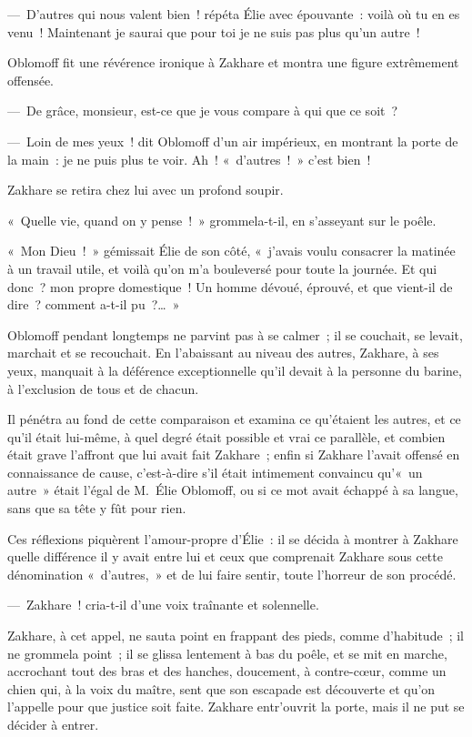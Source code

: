 \documentclass[french,twoside]{book} %
\begin{document}
— D’autres qui nous valent bien ! répéta Élie avec épouvante : voilà où tu en es venu ! Maintenant je saurai que pour toi je ne suis pas plus qu’un autre !\par
Oblomoff fit une révérence ironique à Zakhare et montra une figure extrêmement offensée.\par
— De grâce, monsieur, est-ce que je vous compare à qui que ce soit ?\par
— Loin de mes yeux ! dit Oblomoff d’un air impérieux, en montrant la porte de la main : je ne puis plus te voir. Ah ! « d’autres ! » c’est bien !\par
Zakhare se retira chez lui avec un profond soupir.\par
« Quelle vie, quand on y pense ! » grommela-t-il, en s’asseyant sur le poêle.\par
« Mon Dieu ! » gémissait Élie de son côté, « j’avais voulu consacrer la matinée à un travail utile, et voilà qu’on m’a bouleversé pour toute la journée. Et qui donc ? mon propre domestique ! Un homme dévoué, éprouvé, et que vient-il de dire ? comment a-t-il pu ?… »\par
Oblomoff pendant longtemps ne parvint pas à se calmer ; il se couchait, se levait, marchait et se recouchait. En l’abaissant au niveau des autres, Zakhare, à ses yeux, manquait à la déférence exceptionnelle qu’il devait à la personne du barine, à l’exclusion de tous et de chacun.\par
Il pénétra au fond de cette comparaison et examina ce qu’étaient les autres, et ce qu’il était lui-même, à quel degré était possible et vrai ce parallèle, et combien était grave l’affront que lui avait fait Zakhare ; enfin si Zakhare l’avait offensé en connaissance de cause, c’est-à-dire s’il était intimement convaincu qu’« un autre » était l’égal de M. Élie Oblomoff, ou si ce mot avait échappé à sa langue, sans que sa tête y fût pour rien.\par
Ces réflexions piquèrent l’amour-propre d’Élie : il se décida à montrer à Zakhare quelle différence il y avait entre lui et ceux que comprenait Zakhare sous cette dénomination « d’autres, » et de lui faire sentir, toute l’horreur de son procédé.\par
— Zakhare ! cria-t-il d’une voix traînante et solennelle.\par
Zakhare, à cet appel, ne sauta point en frappant des pieds, comme d’habitude ; il ne grommela point ; il se glissa lentement à bas du poêle, et se mit en marche, accrochant tout des bras et des hanches, doucement, à contre-cœur, comme un chien qui, à la voix du maître, sent que son escapade est découverte et qu’on l’appelle pour que justice soit faite. Zakhare entr’ouvrit la porte, mais il ne put se décider à entrer.\par
\end{document}
